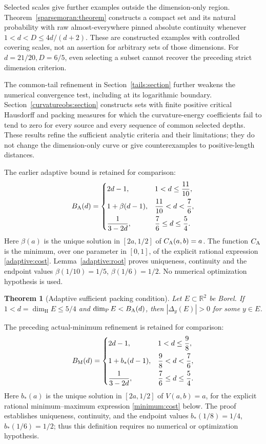 \documentclass[11pt]{article}
\newtheorem{theorem}{Theorem}[section]
\theoremstyle{definition}\newtheorem{remark}[theorem]{Remark}
\newcommand{\R}{\mathbb R}\newcommand{\HH}{\dim_{\mathrm H}}\newcommand{\PP}{\dim_{\mathrm P}}
\begin{document}
Selected scales give further examples outside the dimension-only region.
Theorem~\ref{sparsemoran:theorem} constructs a compact set and its natural
probability with raw almost-everywhere pinned absolute continuity whenever
\(1<d<D\le4d/(d+2)\). These are constructed examples with controlled
covering scales, not an assertion for arbitrary sets of those dimensions.
For \(d=21/20,D=6/5\), even selecting a subset cannot recover the
preceding strict dimension criterion.

The common-tail refinement in Section~\ref{tails:section} further weakens
the numerical convergence test, including at its logarithmic boundary.
Section~\ref{curvatureobs:section} constructs sets with finite positive
critical Hausdorff and packing measures for which the curvature-energy
coefficients fail to tend to zero for every source and every sequence of
common selected depths. These results refine the sufficient analytic
criteria and their limitations; they do not change the dimension-only
curve or give counterexamples to positive-length distances.

The earlier adaptive bound is retained for comparison:
\begin{equation}\label{adaptive:curve}
 B_{\rm A}(d)=\begin{cases}
 2d-1,&1<d\le\dfrac{11}{10},\\[7pt]
 1+\beta(d-1),&\dfrac{11}{10}<d<\dfrac76,\\[7pt]
 \dfrac1{3-2d},&\dfrac76\le d\le\dfrac54.
 \end{cases}
\end{equation}
Here \(\beta(a)\) is the unique solution in \([2a,1/2]\) of
\(C_{\rm A}(a,b)=a\). The function \(C_{\rm A}\) is the minimum, over
one parameter in \([0,1]\), of the explicit rational expression
\eqref{adaptive:cost}. Lemma~\ref{adaptive:root} proves uniqueness,
continuity and the endpoint values \(\beta(1/10)=1/5\),
\(\beta(1/6)=1/2\). No numerical optimization hypothesis is used.

\begin{theorem}[Adaptive sufficient packing condition]\label{target:adaptive}
Let \(E\subset\R^2\) be Borel. If \(1<d=\HH E\le5/4\) and
\(\PP E<B_{\rm A}(d)\), then \(|\Delta_y(E)|>0\) for some \(y\in E\).
\end{theorem}

The preceding actual-minimum refinement is retained for comparison:
\begin{equation}\label{minimum:curve}
 B_{\rm M}(d)=\begin{cases}
 2d-1,&1<d\le\dfrac98,\\[7pt]
 1+b_*(d-1),&\dfrac98<d<\dfrac76,\\[7pt]
 \dfrac1{3-2d},&\dfrac76\le d\le\dfrac54.
 \end{cases}
\end{equation}
Here \(b_*(a)\) is the unique solution in \([2a,1/2]\) of
\(V(a,b)=a\), for the explicit rational minimum--maximum expression
\eqref{minimum:cost} below. The proof establishes uniqueness, continuity,
and the endpoint values \(b_*(1/8)=1/4\), \(b_*(1/6)=1/2\);
thus this definition requires no numerical or optimization hypothesis.
\end{document}
